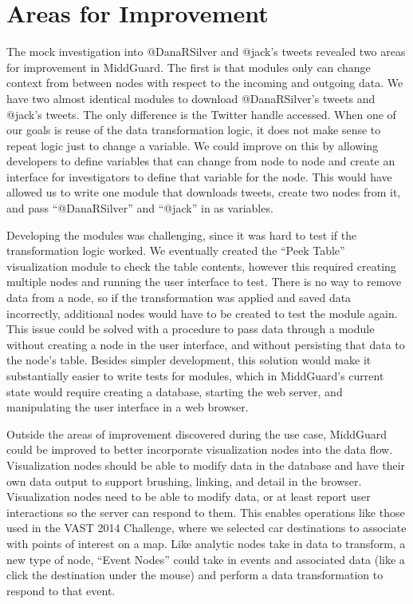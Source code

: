 \documentclass[midd]{thesis}
\begin{document}
\section{Areas for Improvement}

The mock investigation into @DanaRSilver and @jack's tweets revealed two areas
for improvement in MiddGuard. The first is that modules only can change context
from between nodes with respect to the incoming and outgoing data. We have two
almost identical modules to download @DanaRSilver's tweets and @jack's tweets.
The only difference is the Twitter handle accessed. When one of our goals is
reuse of the data transformation logic, it does not make sense to repeat logic
just to change a variable. We could improve on this by allowing developers to
define variables that can change from node to node and create an interface for
investigators to define that variable for the node. This would have allowed us
to write one module that downloads tweets, create two nodes from it, and pass
``@DanaRSilver'' and ``@jack'' in as variables.

Developing the modules was challenging, since it was hard to test if the
transformation logic worked. We eventually created the ``Peek Table''
visualization module to check the table contents, however this required creating
multiple nodes and running the user interface to test. There is no way to remove
data from a node, so if the transformation was applied and saved data
incorrectly, additional nodes would have to be created to test the module again.
This issue could be solved with a procedure to pass data through a module
without creating a node in the user interface, and without persisting that data
to the node's table. Besides simpler development, this solution would make it
substantially easier to write tests for modules, which in MiddGuard's current
state would require creating a database, starting the web server, and
manipulating the user interface in a web browser.

Outside the areas of improvement discovered during the use case, MiddGuard could
be improved to better incorporate visualization nodes into the data flow.
Visualization nodes should be able to modify data in the database and have their
own data output to support brushing, linking, and detail in the browser.
Visualization nodes need to be able to modify data, or at least report user
interactions so the server can respond to them. This enables operations like
those used in the VAST 2014 Challenge, where we selected car destinations to
associate with points of interest on a map. Like analytic nodes take in data to
transform, a new type of node, ``Event Nodes'' could take in events and
associated data (like a click the destination under the mouse) and perform a
data transformation to respond to that event.
\end{document}
